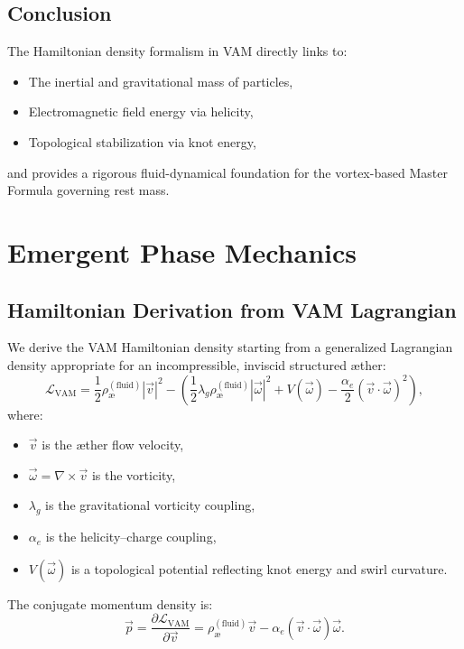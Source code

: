 \documentclass[preprint]{revtex4-2}
\begin{document}
\subsection*{Conclusion}

The Hamiltonian density formalism in VAM directly links to:
\begin{itemize}
    \item The inertial and gravitational mass of particles,
    \item Electromagnetic field energy via helicity,
    \item Topological stabilization via knot energy,
\end{itemize}
and provides a rigorous fluid-dynamical foundation for the vortex-based Master Formula governing rest mass.
\section{Emergent Phase Mechanics}
\subsection{Hamiltonian Derivation from VAM Lagrangian}

We derive the VAM Hamiltonian density starting from a generalized Lagrangian density appropriate for an incompressible, inviscid structured \ae ther:
\begin{equation}
\mathcal{L}_\text{VAM} = \frac{1}{2} \rho_\text{\ae}^{(\text{fluid})} |\vec{v}|^2
- \left( \frac{1}{2} \lambda_g \rho_\text{\ae}^{(\text{fluid})} |\vec{\omega}|^2
+ V(\vec{\omega}) - \frac{\alpha_e}{2} (\vec{v} \cdot \vec{\omega})^2 \right),
\end{equation}
where:
\begin{itemize}
  \item $\vec{v}$ is the \ae ther flow velocity,
  \item $\vec{\omega} = \nabla \times \vec{v}$ is the vorticity,
  \item $\lambda_g$ is the gravitational vorticity coupling,
  \item $\alpha_e$ is the helicity--charge coupling,
  \item $V(\vec{\omega})$ is a topological potential reflecting knot energy and swirl curvature.
\end{itemize}

The conjugate momentum density is:
\begin{equation}
\vec{p} = \frac{\partial \mathcal{L}_\text{VAM}}{\partial \vec{v}}
= \rho_\text{\ae}^{(\text{fluid})} \vec{v}
- \alpha_e (\vec{v} \cdot \vec{\omega}) \vec{\omega}.
\end{equation}
\end{document}
